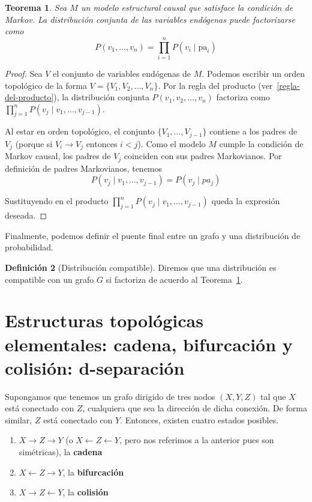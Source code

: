 \documentclass[a4paper,11pt,spanish, twoside]{tfg-uam-matematicas_25-26}
\newtheorem{teor}{Teorema}[chapter]
\theoremstyle{definition}
\newtheorem{defin}[teor]{Definición}
\begin{document}
\begin{teor}
\label{distro-compat-teorema}
Sea $M$ un modelo estructural causal que satisface la condición de Markov. La distribución conjunta de las variables endógenas puede factorizarse como
\begin{equation*}
P(v_1, \ldots, v_n) = \prod_{i=1}^n P(v_i \mid \text{pa}_i)
\end{equation*}
\end{teor}
\begin{proof}
Sea $V$ el conjunto de variables endógenas de $M$. Podemos escribir un orden topológico de la forma $V = \{V_1, V_2, \ldots, V_n\}$. Por la regla del producto (ver~\ref{regla-del-producto}), la distribución conjunta $P(v_1, v_2, \ldots, v_n)$ factoriza como $\prod_{j=1}^n P(v_j \mid v_1, \ldots, v_{j-1})$.

Al estar en orden topológico, el conjunto $\{V_1, \ldots, V_{j-1}\}$ contiene a los padres de $V_j$ (porque si $V_i \to V_j$ entonces $i < j$). Como el modelo $M$ cumple la condición de Markov causal, los padres de $V_j$ coinciden con sus padres Markovianos. Por definición de padres Markovianos, tenemos
\begin{equation*}
P(v_j \mid v_1, \ldots, v_{j-1}) = P(v_j\mid pa_j)
\end{equation*}

Sustituyendo en el producto $\prod_{j=1}^n P(v_j \mid v_1, \ldots, v_{j-1})$ queda la expresión deseada.
\end{proof}

Finalmente, podemos definir el puente final entre un grafo y una distribución de probabilidad.

\begin{defin}[Distribución compatible]
Diremos que una distribución es compatible con un grafo $G$ si factoriza de acuerdo al Teorema~\ref{distro-compat-teorema}.
\end{defin}

\section{Estructuras topológicas elementales: cadena, bifurcación y colisión: d-separación}
Supongamos que tenemos un grafo dirigido de tres nodos $(X, Y, Z)$ tal que $X$ está conectado con $Z$, cualquiera que sea la dirección de dicha conexión. De forma similar, $Z$ está conectado con $Y$. Entonces, existen cuatro estados posibles.
\begin{enumerate}
    \item $X \rightarrow Z \rightarrow Y$ (o $X \leftarrow Z \leftarrow Y$, pero nos referimos a la anterior pues son simétricas), la \textbf{cadena}
    \item $X \leftarrow Z \rightarrow Y$, la \textbf{bifurcación}
    \item $X \rightarrow Z \leftarrow Y$, la \textbf{colisión}
\end{enumerate}
\end{document}
